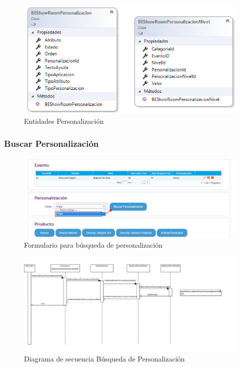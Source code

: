 \documentclass[a4paper,11pt]{paper}
\begin{document}
\begin{figure}[!h]
\centering
\includegraphics[width=1.0\textwidth]{imgs/Personalizacion/EntidadPersonalizacion.png}
\caption{Entidades Personalización}
\end{figure}

\newpage
\subsubsection{Buscar Personalización}

\begin{figure}[h]
\centering
\includegraphics[width=1.0\textwidth]{imgs/Personalizacion/FormularioBuscarPersonalizacion.png}
\caption{Formulario para búsqueda de personalización}
\end{figure}

\begin{landscape}
\begin{figure}[!h]
\centering
\includegraphics[width=1.5\textwidth]{imgs/Personalizacion/BuscarPersonalizacion.png}
\caption{Diagrama de secuencia Búsqueda de Personalización}
\end{figure}
\end{landscape} 
\end{document}
